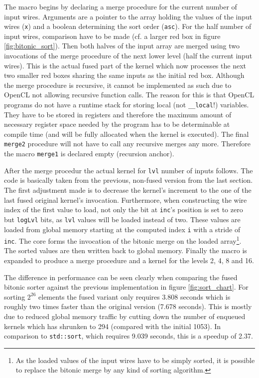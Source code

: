The macro begins by declaring a merge procedure for the current number of input wires. Arguments are a pointer to the array holding the values of the input wires (\lstinline!x!) and a boolean determining the sort order (\lstinline!asc!). For the half number of input wires, comparison have to be made (cf. a larger red box in figure \ref{fig:bitonic_sort}). Then both halves of the input array are merged using two invocations of the merge procedure of the next lower level (half the current input wires). This is the actual fused part of the kernel which now processes the next two smaller red boxes sharing the same inputs as the initial red box. Although the merge procedure is recursive, it cannot be implemented as such due to OpenCL not allowing recursive function calls. The reason for this is that OpenCL programs do not have a runtime stack for storing local (not \lstinline!__local!!) variables. They have to be stored in registers and therefore the maximum amount of necessary register space needed by the program has to be determinable at compile time (and will be fully allocated when the kernel is executed). The final \lstinline!merge2! procedure will not have to call any recursive merges any more. Therefore the macro \lstinline!merge1! is declared empty (recursion anchor).

After the merge procedur the actual kernel for \lstinline!lvl! number of inputs follows. The code is basically taken from the previous, non-fused version from the last section. The first adjustment made is to decrease the kernel's increment to the one of  the last fused original kernel's invocation. Furthermore, when constructing the wire index of the first value to load, not only the bit at \lstinline!inc!'s position is set to zero but \lstinline!logLvl! bits, as \lstinline!lvl! values will be loaded instead of two. These values are loaded from global memory starting at the computed index \lstinline!i! with a stride of \lstinline!inc!. The core forms the invocation of the bitonic merge on the loaded array\footnote{As the loaded values of the input wires have to be simply sorted, it is possible to replace the bitonic merge by any kind of sorting algorithm.}. The sorted values are then written back to global memory.
Finally the macro is expanded to produce a merge procedure and a kernel for the levels 2, 4, 8 and 16.

The difference in performance can be seen clearly when comparing the fused bitonic sorter against the previous implementation in figure \ref{fig:sort_chart}. For sorting $2^{26}$ elements the fused variant only requires 3.808 seconds which is roughly two times faster than the original version (7.678 seconds). This is mostly due to reduced global memory traffic by cutting down the number of enqueued kernels which has shrunken to 294 (compared with the initial 1053). In comparison to \lstinline!std::sort!, which requires 9.039 seconds, this is a speedup of 2.37.


